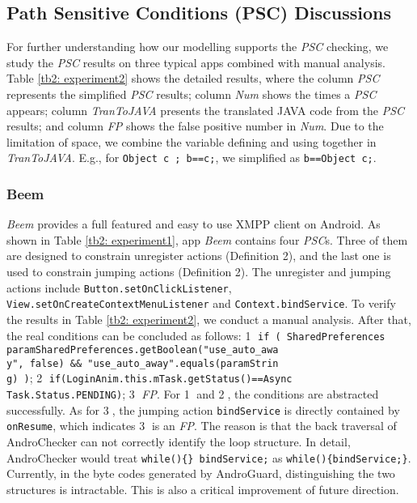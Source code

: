 \subsection{Path Sensitive Conditions (PSC) Discussions}

For further understanding how our modelling supports the \textit{PSC} checking, we study the \textit{PSC} results on three typical apps combined with manual analysis. Table \ref{tb2: experiment2} shows the detailed results, where the column \textit{PSC} represents the simplified \textit{PSC} results; column \textit{Num} shows the times a \textit{PSC} appears;  column \textit{TranToJAVA} presents the translated JAVA code from the \textit{PSC} results; and column \textit{FP} shows the false positive number in \textit{Num}. Due to the limitation of space, we combine the variable defining and using together in \textit{TranToJAVA}. E.g., for \texttt{Object c ; b==c;}, we simplified as \texttt{b==Object c;}. 

\subsubsection{Beem}
\textit{Beem} provides a full featured and easy to use XMPP client on Android. As shown in Table \ref{tb2: experiment1}, app \textit{Beem} contains four \textit{PSC}s. Three of them are designed to constrain unregister actions (Definition 2), and the last one is used to constrain jumping actions (Definition 2). The unregister and jumping actions include \texttt{Button.setOnClickListener}, \texttt{View.setOnCreateContextMenuListener} and \texttt{Context.bindService}. To verify the results in Table \ref{tb2: experiment2}, we conduct a manual analysis.  After that, the real conditions can be concluded as follows: \textcircled{1} \texttt{if ( SharedPreferences paramSharedPreferences.getBoolean("use\_auto\_awa}  \\
\texttt{y", false) \&\& "use\_auto\_away".equals(paramStrin}\\
\texttt{g) )}; \textcircled{2} \texttt{if(LoginAnim.this.mTask.getStatus()==Async}\\
\texttt{Task.Status.PENDING)}; \textcircled{3} \textit{FP}. For  \textcircled{1} and \textcircled{2}, the conditions are abstracted successfully. As for \textcircled{3}, the jumping action \texttt{bindService} is directly contained by \texttt{onResume}, which indicates \textcircled{3} is an \textit{FP}. The reason is that the back traversal of AndroChecker can not correctly identify the loop structure. In detail, AndroChecker would treat \texttt{while()\{\} bindService;} as \texttt{while()\{bindService;\}}. Currently, in the byte codes generated by AndroGuard, distinguishing the two structures is intractable. This is also a critical improvement of future direction.


